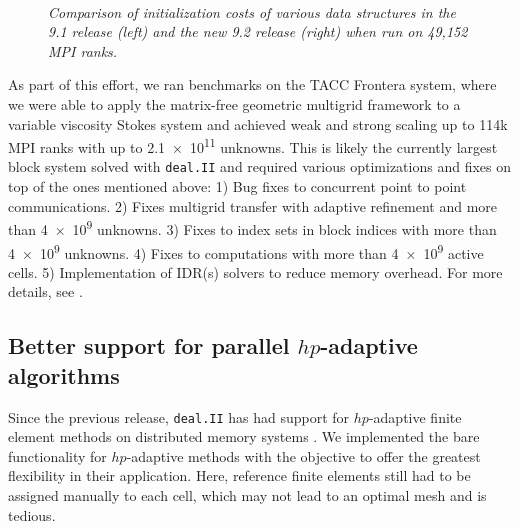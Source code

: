 \documentclass{ansarticle-preprint}
\newcommand{\specialword}[1]{\texttt{#1}}
\newcommand{\dealii}{{\specialword{deal.II}}\xspace}
\begin{document}
\begin{figure}
  \\
  \strut\hfill{}\hfill\strut
  \caption{\it Comparison of initialization costs of various data structures in the 9.1 release (left) and the new 9.2 release (right) when run on 49,152 MPI ranks.}
  \label{fig:init_costs}
\end{figure}


As part of this effort, we ran benchmarks on the TACC Frontera system, where we were able to apply the matrix-free geometric multigrid framework to a variable viscosity Stokes system and achieved weak and strong scaling up to 114k MPI ranks with up to
\num{2.1e11} unknowns. This is likely the currently largest block system solved with \dealii{} and required various optimizations
and fixes on top of the ones mentioned above:
1) Bug fixes to concurrent point to point communications.
2) Fixes multigrid transfer with adaptive refinement and more than \num{4e9} unknowns.
3) Fixes to index sets in block indices with more than \num{4e9} unknowns.
4) Fixes to computations with more than \num{4e9} active cells.
5) Implementation of IDR(s) solvers to reduce memory overhead.
For more details, see \cite{clevenger_stokes19}.



\subsection{Better support for parallel $hp$-adaptive algorithms}
\label{subsec:hp}

Since the previous release, \dealii{} has had support for $hp$-adaptive finite element methods
on distributed memory systems \cite{dealII91}. We implemented the bare functionality
for $hp$-adaptive methods with the objective to offer the greatest flexibility in
their application. Here, reference finite elements still had to be assigned manually
to each cell, which may not lead to an optimal mesh and is tedious.
\end{document}
